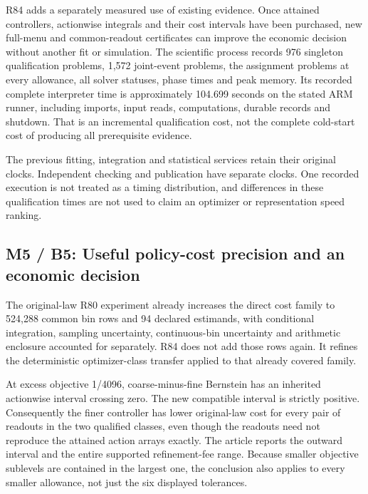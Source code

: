 R84 adds a separately measured use of existing evidence. Once attained
controllers, actionwise integrals and their cost intervals have been
purchased, new full-menu and common-readout certificates can improve the
economic decision without another fit or simulation. The scientific
process records 976 singleton qualification problems, 1,572 joint-event
problems, the assignment problems at every allowance, all solver
statuses, phase times and peak memory. Its recorded complete interpreter
time is approximately 104.699 seconds on the stated ARM runner,
including imports, input reads, computations, durable records and
shutdown. That is an incremental qualification cost, not the complete
cold-start cost of producing all prerequisite evidence.

The previous fitting, integration and statistical services retain their
original clocks. Independent checking and publication have separate
clocks. One recorded execution is not treated as a timing distribution,
and differences in these qualification times are not used to claim an
optimizer or representation speed ranking.

\hypertarget{m5-b5-useful-policy-cost-precision-and-an-economic-decision}{%
\subsection{M5 / B5: Useful policy-cost precision and an economic
decision}\label{m5-b5-useful-policy-cost-precision-and-an-economic-decision}}

The original-law R80 experiment already increases the direct cost family
to 524,288 common bin rows and 94 declared estimands, with conditional
integration, sampling uncertainty, continuous-bin uncertainty and
arithmetic enclosure accounted for separately. R84 does not add those
rows again. It refines the deterministic optimizer-class transfer
applied to that already covered family.

At excess objective 1/4096, coarse-minus-fine Bernstein has an inherited
actionwise interval crossing zero. The new compatible interval is
strictly positive. Consequently the finer controller has lower
original-law cost for every pair of readouts in the two qualified
classes, even though the readouts need not reproduce the attained action
arrays exactly. The article reports the outward interval and the entire
supported refinement-fee range. Because smaller objective sublevels are
contained in the largest one, the conclusion also applies to every
smaller allowance, not just the six displayed tolerances.


